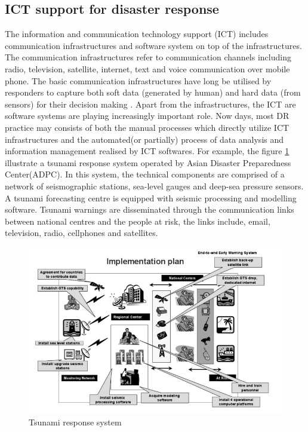 \subsection{ICT support for disaster response}
The information and communication technology support (ICT) includes communication infrastructures and software system on top of the infrastructures. The communication infrastructures refer to communication channels including radio, television, satellite, internet, text and voice communication over mobile phone. The basic communication infrastructures have long be utilised by responders to capture both soft data (generated by human) and hard data (from sensors) for their decision making \cite{Fischer2012}. Apart from the infrastructures, the ICT are  software systems are playing increasingly important role. Now days, most DR practice may consists  of both the manual processes which directly utilize ICT infrastructures and the automated(or partially) process of data analysis and information management realised by ICT softwares. For example, the figure \ref{fig:ICTExample} illustrate a tsunami response system operated by Asian Disaster Preparedness Center(ADPC). In this system,  the technical components are comprised of a network of seismographic stations, sea-level gauges and deep-sea pressure sensors. A tsunami forecasting centre is equipped with seismic processing and modelling software.  Tsunami warnings are disseminated through the communication links between national centres and the people at risk, the links include, email, television, radio, cellphones and satellites.\\

\begin{figure}[h]
  \centering
  \includegraphics[width=1\textwidth]{img/background/ICTExample}
  \caption{Tsunami response system}
  \label{fig:ICTExample}
\end{figure}

